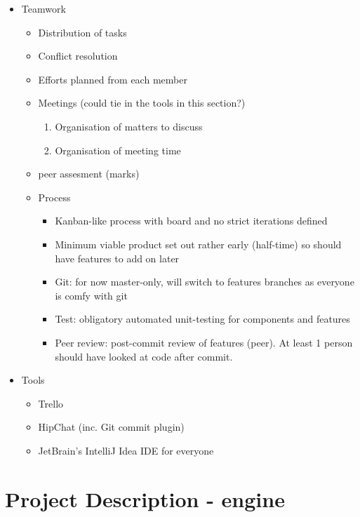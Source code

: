 \begin{itemize}
	\item Teamwork
	\begin{itemize}
		\item Distribution of tasks
    	\item Conflict resolution
    	\item Efforts planned from each member
    	\item Meetings (could tie in the tools in this section?)
        \begin{enumerate}
            \item Organisation of matters to discuss
            \item Organisation of meeting time
        \end{enumerate}
        \item peer assesment (marks)

        \item Process
        \begin{itemize}
            \item Kanban-like process with board and no strict iterations defined
            \item Minimum viable product set out rather early (half-time) so should have features to add on later
            \item Git: for now master-only, will switch to features branches as everyone is comfy with git
            \item Test: obligatory automated unit-testing for components and features
            \item Peer review: post-commit review of features (peer). At least 1 person should have looked at code after commit.
        \end{itemize}
	\end{itemize}

	\item Tools
	\begin{itemize}
		\item Trello
		\item HipChat (inc. Git commit plugin)
	    \item JetBrain's IntelliJ Idea IDE for everyone
	\end{itemize}

\end{itemize}

\section{Project Description - engine} 

